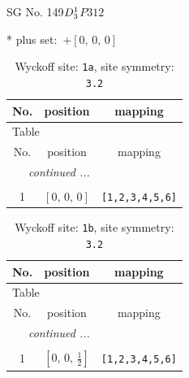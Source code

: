 \documentclass[fleqn,8pt]{jsarticle}
\begin{document}
\setcounter{MaxMatrixCols}{32}

\renewcommand{\tablename}{Table~}
\renewcommand{\figurename}{Figure~}
\begin{center}
\LARGE
SG No. 149\quad$D_{\rm 3}^{1}$\quad$P312$\quad[ trigonal ]
\end{center}
* plus set:\,\,\,$+\left[ 0,\, 0,\, 0 \right]$
\renewcommand{\arraystretch}{1.2}
\begin{longtable}{ccc}
\caption{Wyckoff site: {\tt 1a}, site symmetry: {\tt 3.2}}
 \\
 \hline \hline
No. & position & mapping \\ \hline \endfirsthead

\multicolumn{2}{l}{\tablename\ \thetable{}} \\
 \hline \hline
No. & position & mapping \\ \hline \endhead

 \hline \hline
\multicolumn{2}{r}{\footnotesize\it continued ...} \\ \endfoot

 \hline \hline
\multicolumn{2}{r}{} \\ \endlastfoot

1 & $\left[ 0,\, 0,\, 0 \right]$ & {\tt [1,2,3,4,5,6]} \\
\end{longtable}
\renewcommand{\arraystretch}{1.2}
\begin{longtable}{ccc}
\caption{Wyckoff site: {\tt 1b}, site symmetry: {\tt 3.2}}
 \\
 \hline \hline
No. & position & mapping \\ \hline \endfirsthead

\multicolumn{2}{l}{\tablename\ \thetable{}} \\
 \hline \hline
No. & position & mapping \\ \hline \endhead

 \hline \hline
\multicolumn{2}{r}{\footnotesize\it continued ...} \\ \endfoot

 \hline \hline
\multicolumn{2}{r}{} \\ \endlastfoot

1 & $\left[ 0,\, 0,\, \frac{1}{2} \right]$ & {\tt [1,2,3,4,5,6]} \\
\end{longtable}
\renewcommand{\arraystretch}{1.2}
\end{document}
